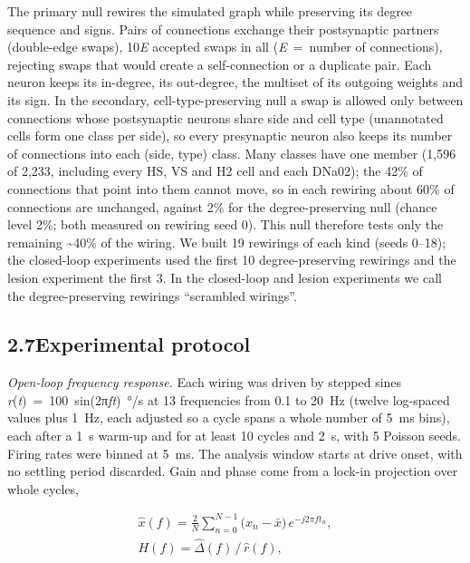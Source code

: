 \documentclass[11pt,letterpaper]{article}
\begin{document}
\noindent The primary null rewires the simulated graph while preserving
its degree sequence and signs. Pairs of connections exchange their
postsynaptic partners (double-edge swaps), 10\emph{E} accepted swaps in
all (\emph{E}~=~number of connections), rejecting swaps that would
create a self-connection or a duplicate pair. Each neuron keeps its
in-degree, its out-degree, the multiset of its outgoing weights and its
sign. In the secondary, cell-type-preserving null a swap is allowed only
between connections whose postsynaptic neurons share side and cell type
(unannotated cells form one class per side), so every presynaptic neuron
also keeps its number of connections into each (side, type) class. Many
classes have one member (1,596 of 2,233, including every HS, VS and H2
cell and each DNa02); the 42\% of connections that point into them
cannot move, so in each rewiring about 60\% of connections are
unchanged, against 2\% for the degree-preserving null (chance level 2\%;
both measured on rewiring seed 0). This null therefore tests only the
remaining \textasciitilde40\% of the wiring. We built 19 rewirings of
each kind (seeds 0--18); the closed-loop experiments used the first 10
degree-preserving rewirings and the lesion experiment the first 3. In
the closed-loop and lesion experiments we call the degree-preserving
rewirings ``scrambled wirings''.

\subsection{\texorpdfstring{2.7\quad Experimental
protocol}{2.7Experimental protocol}}\label{experimental-protocol}

\noindent \emph{Open-loop frequency response.} Each wiring was driven by
stepped sines \emph{r}(\emph{t})~=~100~sin(2π\emph{ft})~°/s at 13
frequencies from 0.1 to 20~Hz (twelve log-spaced values plus 1~Hz, each
adjusted so a cycle spans a whole number of 5~ms bins), each after a 1~s
warm-up and for at least 10 cycles and 2~s, with 5 Poisson seeds. Firing
rates were binned at 5~ms. The analysis window starts at drive onset,
with no settling period discarded. Gain and phase come from a lock-in
projection over whole cycles,

\[\begin{gathered}\hat x(f)=\frac{2}{N}\sum_{n=0}^{N-1}\bigl(x_n-\bar x\bigr)\,e^{-j2\pi f t_n},\\ H(f)=\hat\Delta(f)\,/\,\hat r(f),\end{gathered}\tag{9}\]
\end{document}
